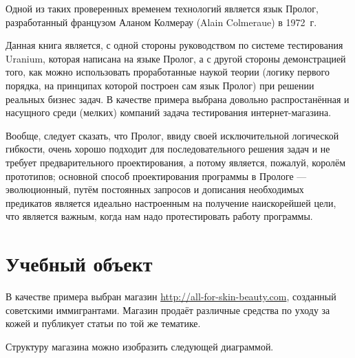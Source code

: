 \documentclass[a4paper]{book}
\def\ur{Uranium}
\begin{document}
Одной из таких проверенных временем технологий является язык
Пролог, разработанный французом Аланом Колмерау (Alain Colmeraue)
в 1972~г.

Данная книга является, с одной стороны руководством по системе
тестирования \ur, которая написана на языке Пролог, а с другой
стороны демонстрацией того, как можно использовать проработанные
наукой теории (логику первого порядка, на принципах которой
построен сам язык Пролог) при решении реальных бизнес задач. В
качестве примера выбрана довольно распростанённая и насущного
среди (мелких) компаний задача тестирования интернет-магазина.

Вообще, следует сказать, что Пролог, ввиду своей исключительной
логической гибкости, очень хорошо подходит для последовательного
решения задач и не требует предварительного проектирования, а
потому является, пожалуй, королём прототипов; основной способ
проектирования программы в Прологе --- эволюционный, путём
постоянных запросов и дописания необходимых предикатов является
идеально настроенным на получение наискорейшей цели, что является
важным, когда нам надо протестировать работу программы.

\chapter{Учебный объект}

В качестве примера выбран магазин
\url{http://all-for-skin-beauty.com}, созданный советскими
иммигрантами. Магазин продаёт различные средства по уходу за
кожей и публикует статьи по той же тематике.

Структуру магазина можно изобразить следующей диаграммой.

\begin{figure}[h!]
\label{eshop_diagram}
\end{figure}
\end{document}
